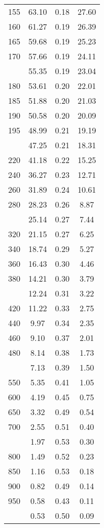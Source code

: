 \begin{table}[ht]
\begin{tabular}{lccc}
  155 & 63.10 & 0.18 & 27.60 \\ 
  160 & 61.27 & 0.19 & 26.39 \\ 
  165 & 59.68 & 0.19 & 25.23 \\ 
  170 & 57.66 & 0.19 & 24.11 \\ 
   \addlinespace
175 & 55.35 & 0.19 & 23.04 \\ 
  180 & 53.61 & 0.20 & 22.01 \\ 
  185 & 51.88 & 0.20 & 21.03 \\ 
  190 & 50.58 & 0.20 & 20.09 \\ 
  195 & 48.99 & 0.21 & 19.19 \\ 
   \addlinespace
200 & 47.25 & 0.21 & 18.31 \\ 
  220 & 41.18 & 0.22 & 15.25 \\ 
  240 & 36.27 & 0.23 & 12.71 \\ 
  260 & 31.89 & 0.24 & 10.61 \\ 
  280 & 28.23 & 0.26 & 8.87 \\ 
   \addlinespace
300 & 25.14 & 0.27 & 7.44 \\ 
  320 & 21.15 & 0.27 & 6.25 \\ 
  340 & 18.74 & 0.29 & 5.27 \\ 
  360 & 16.43 & 0.30 & 4.46 \\ 
  380 & 14.21 & 0.30 & 3.79 \\ 
   \addlinespace
400 & 12.24 & 0.31 & 3.22 \\ 
  420 & 11.22 & 0.33 & 2.75 \\ 
  440 & 9.97 & 0.34 & 2.35 \\ 
  460 & 9.10 & 0.37 & 2.01 \\ 
  480 & 8.14 & 0.38 & 1.73 \\ 
   \addlinespace
500 & 7.13 & 0.39 & 1.50 \\ 
  550 & 5.35 & 0.41 & 1.05 \\ 
  600 & 4.19 & 0.45 & 0.75 \\ 
  650 & 3.32 & 0.49 & 0.54 \\ 
  700 & 2.55 & 0.51 & 0.40 \\ 
   \addlinespace
750 & 1.97 & 0.53 & 0.30 \\ 
  800 & 1.49 & 0.52 & 0.23 \\ 
  850 & 1.16 & 0.53 & 0.18 \\ 
  900 & 0.82 & 0.49 & 0.14 \\ 
  950 & 0.58 & 0.43 & 0.11 \\ 
   \addlinespace
1000 & 0.53 & 0.50 & 0.09 \\ 
   \bottomrule
\end{tabular}
\end{table}

